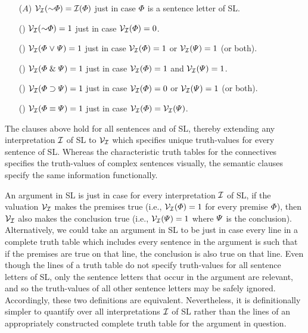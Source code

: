 \begin{enumerate}[labelsep=.15in]
  \item[($A$)] $\V{\I}(\enot\metaA{})=\I(\metaA{})$ just in case $\varPhi{}$ is a sentence letter of SL.
  \item[(\enot)] $\V{\I}(\enot\metaA{})=1$ just in case $\mathcal{V}_{\mathcal{I}}(\varPhi{})=0$.
  \item[(\eor)] $\mathcal{V}_{\mathcal{I}}(\varPhi{} \mkern1mu\vee\mkern1mu \varPsi{})=1$ just in case $\mathcal{V}_{\mathcal{I}}(\varPhi{})=1$ or $\mathcal{V}_{\mathcal{I}}(\varPsi{})=1$ (or both).
  \item[(\eand)] $\mathcal{V}_{\mathcal{I}}(\varPhi{} \mathrel\& \varPsi{})=1$ just in case $\mathcal{V}_{\mathcal{I}}(\varPhi{})=1$ and $\mathcal{V}_{\mathcal{I}}(\varPsi{})=1$.
  \item[(\eif)] $\mathcal{V}_{\mathcal{I}}(\varPhi{} \supset \varPsi{})=1$ just in case $\mathcal{V}_{\mathcal{I}}(\varPhi{})=0$ or $\mathcal{V}_{\mathcal{I}}(\varPsi{})=1$ (or both).
  \item[(\eiff)] $\mathcal{V}_{\mathcal{I}}(\varPhi{} \equiv \varPsi{})=1$ just in case $\mathcal{V}_{\mathcal{I}}(\varPhi{})=\mathcal{V}_{\mathcal{I}}(\varPsi{})$.
\end{enumerate}

The clauses above hold for all sentences \metaA{} and \metaB{} of SL, thereby extending any interpretation $\mathcal{I}$ of SL to $\mathcal{V}_{\mathcal{I}}$ which specifies unique truth-values for every sentence of SL.
Whereas the characteristic truth tables for the connectives specifies the truth-values of complex sentences visually, the semantic clauses specify the same information functionally.

An argument in SL is  just in case for every interpretation $\mathcal{I}$ of SL, if the valuation $\mathcal{V}_{\mathcal{I}}$ makes the premises true (i.e., $\mathcal{V}_{\mathcal{I}}(\varPhi{})=1$ for every premise $\varPhi{}$), then $\mathcal{V}_{\mathcal{I}}$ also makes the conclusion true (i.e., $\mathcal{V}_{\mathcal{I}}(\varPsi{})=1$ where $\varPsi{}$ is the conclusion).
Alternatively, we could take an argument in SL to be  just in case every line in a complete truth table which includes every sentence in the argument is such that if the premises are true on that line, the conclusion is also true on that line.
Even though the lines of a truth table do not specify truth-values for all sentence letters of SL, only the sentence letters that occur in the argument are relevant, and so the truth-values of all other sentence letters may be safely ignored.
Accordingly, these two definitions are equivalent.
Nevertheless, it is definitionally simpler to quantify over all interpretations $\mathcal{I}$ of SL rather than the lines of an appropriately constructed complete truth table for the argument in question.

